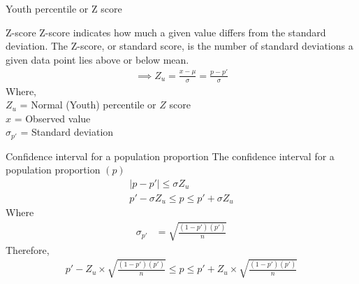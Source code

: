 \documentclass{beamer}
\begin{document}
\begin{frame}{Youth percentile or Z score}
    \begin{block}{Z-score}
       Z-score indicates how much a given value differs from the
    standard deviation. The Z-score, or standard score, is the number of standard deviations a given data point lies above or below mean.
    \begin{align}
        \implies Z_u = \frac{x-\mu}{\sigma} = \frac{p-p'}{\sigma}
    \end{align}
     Where,\\
        $Z_u$ = Normal (Youth) percentile or $Z$ score\\
        $ x $ = Observed value\\
        $\sigma_{p'} $ = Standard deviation
        
    \end{block}
\end{frame}
\begin{frame}{}
     \begin{block}{Confidence interval for a population proportion}
        The confidence interval for a population proportion $(p)$
        \begin{align}
        | p-p' | \leq \sigma Z_u\\
        p'-\sigma Z_u \leq p \leq p'+\sigma Z_u
        \end{align}
        Where
        \begin{align}
            \sigma_{p'} &= \sqrt{\frac{(1-p')(p')}{n}}
        \end{align}
    Therefore,
        \begin{align}
           p' - Z_u \times \sqrt{\frac{(1-p')(p')}{n}} \leq p \leq p' + Z_u \times \sqrt{\frac{(1-p')(p')}{n}}\label{4}
        \end{align}
    \end{block}
\end{frame}
\end{document}
